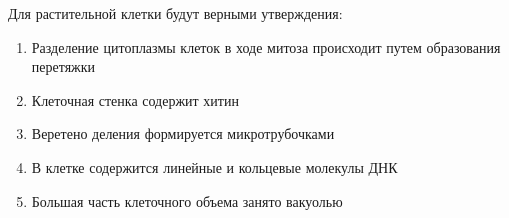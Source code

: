 
Для растительной клетки будут верными
утверждения:

\begin{enumerate}
    \item Разделение цитоплазмы клеток в ходе митоза происходит путем образования перетяжки
    \item Клеточная стенка содержит хитин 
    \item Веретено деления формируется микротрубочками
    \item В клетке содержится линейные и кольцевые молекулы ДНК
    \item Большая часть клеточного объема занято вакуолью
\end{enumerate}




